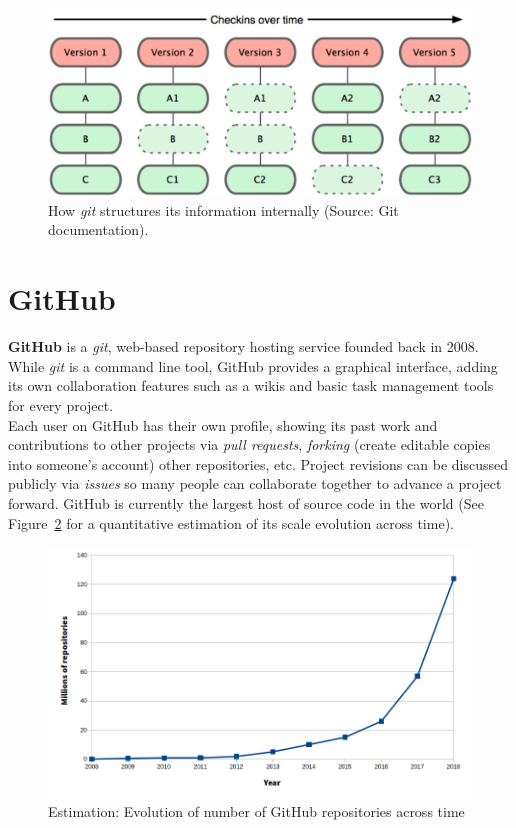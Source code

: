 \documentclass[a4paper, 12pt]{book}
\begin{document}
\begin{figure}
  \centering
  \includegraphics[width=12cm, keepaspectratio]{img/snapshots-git}
  \caption{How \emph{git} structures its information internally (Source: Git documentation).}
  \label{fig:info-git}
\end{figure}
\section{GitHub}
\label{sec:github}
\textbf{GitHub} is a \emph{git}, web-based repository hosting service founded back in 2008. While \emph{git} is a command
line tool, GitHub provides a graphical interface, adding its own collaboration features such as a wikis and basic task
management tools for every project.\\
Each user on GitHub has their own profile, showing its past work and contributions to
other projects via \textit{pull requests}, \textit{forking} (create editable copies into someone's account) other repositories, etc.
Project revisions can be discussed publicly via \textit{issues} so many people can collaborate together to advance a project
forward. GitHub is currently the largest host of source code in the world (See Figure~\ref{fig:total-repo-number} for a quantitative
estimation of its scale evolution across time).
\begin{figure}
  \centering
  \includegraphics[width=14cm, keepaspectratio]{img/number-github-repos}
  \caption{Estimation: Evolution of number of GitHub repositories across time}
  \label{fig:total-repo-number}
\end{figure}
\end{document}
